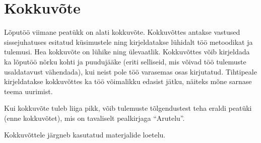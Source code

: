 \section*{Kokkuvõte}\label{sec:summary}

Lõputöö viimane peatükk on alati kokkuvõte.
Kokkuvõttes antakse vastused sissejuhatuses esitatud küsimustele ning kirjeldatakse lühidalt töö metoodikat ja tulemusi.
Hea kokkuvõte on lühike ning ülevaatlik.
Kokkuvõttes võib kirjeldada ka lõputöö nõrku kohti ja puudujääke (eriti selliseid, mis võivad töö tulemuste usaldatavust vähendada), kui neist pole töö varasemas osas kirjutatud.
Tihtipeale kirjeldatakse kokkuvõttes ka töö võimalikku edasist jätku, näiteks mõne sarnase teema uurimist.

Kui kokkuvõte tuleb liiga pikk, võib tulemuste tõlgendustest teha eraldi peatüki (enne kokkuvõtet), mis on tavaliselt pealkirjaga "`Arutelu"'.

Kokkuvõttele järgneb kasutatud materjalide loetelu.